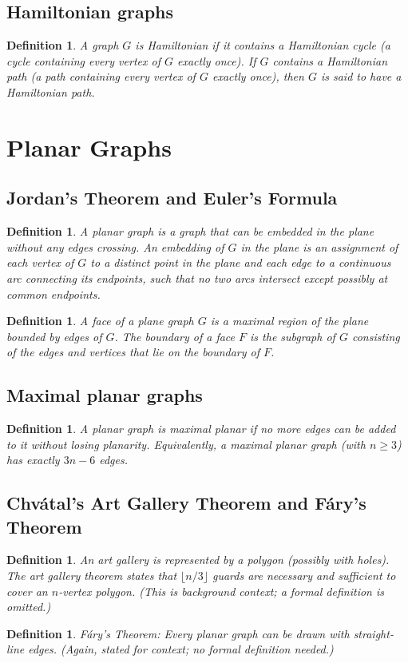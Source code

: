 \documentclass[11pt]{article}
\newtheorem{definition}[theorem]{Definition}
\begin{document}
\subsection{Hamiltonian graphs}
\begin{definition}
A graph $G$ is Hamiltonian if it contains a Hamiltonian cycle (a cycle containing every vertex of $G$ exactly once). If $G$ contains a Hamiltonian path (a path containing every vertex of $G$ exactly once), then $G$ is said to have a Hamiltonian path.
\end{definition}
\section{Planar Graphs}
\subsection{Jordan’s Theorem and Euler’s Formula}
\begin{definition}
A planar graph is a graph that can be embedded in the plane without any edges crossing. An embedding of $G$ in the plane is an assignment of each vertex of $G$ to a distinct point in the plane and each edge to a continuous arc connecting its endpoints, such that no two arcs intersect except possibly at common endpoints.
\end{definition}
\begin{definition}
A face of a plane graph $G$ is a maximal region of the plane bounded by edges of $G$. The boundary of a face $F$ is the subgraph of $G$ consisting of the edges and vertices that lie on the boundary of $F$.
\end{definition}
\subsection{Maximal planar graphs}
\begin{definition}
A planar graph is maximal planar if no more edges can be added to it without losing planarity. Equivalently, a maximal planar graph (with $n\ge 3$) has exactly $3n-6$ edges.
\end{definition}
\subsection{Chvátal’s Art Gallery Theorem and Fáry’s Theorem}
\begin{definition}
An art gallery is represented by a polygon (possibly with holes). The art gallery theorem states that $\lfloor n/3\rfloor$ guards are necessary and sufficient to cover an $n$-vertex polygon. (This is background context; a formal definition is omitted.)
\end{definition}
\begin{definition}
Fáry’s Theorem: Every planar graph can be drawn with straight-line edges. (Again, stated for context; no formal definition needed.)
\end{definition}
\end{document}
